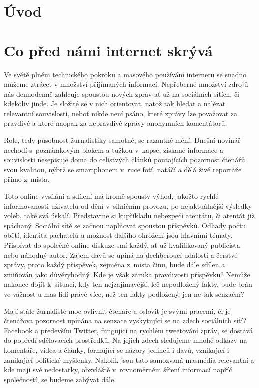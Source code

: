 \documentclass[12pt, a4paper]{article}
\numberwithin{equation}{section} 	%
\begin{document}

\newpage
\section*{Úvod}
\noindent

\newpage
\section{Co před námi internet skrývá}
\noindent Ve světě plném technického pokroku a masového používání internetu se snadno můžeme ztrácet v množství přijímaných informací. Nepřeberné množství zdrojů nás dennodenně zahlcuje spoustou nových zpráv ať už na sociálních sítích, či kdekoliv jinde. Je složité se v nich orientovat, natož tak hledat a nalézat relevantní souvislosti, neboť nikde není psáno, které zprávy lze považovat za pravdivé a které naopak za nepravdivé zprávy anonymních komentátorů.

Role, tedy působnost žurnalistiky samotné, se razantně mění. Dnešní novinář nechodí s poznámkovým blokem a tužkou v kapse, získané informace a souvislosti nesepisuje doma do celistvých článků poutajících pozornost čtenářů svou kvalitou, nýbrž se smartphonem v ruce fotí, natáčí a dělá živé reportáže přímo z místa.

Toto online vysílání a sdílení má kromě spousty výhod, jakožto rychlé informovanosti uživatelů od dění v silničním provozu, po nejaktuálnější výsledky voleb, také svá úskalí. Představme si kupříkladu nebezpečí atentátu, či atentát již spáchaný. Sociální sítě se začnou naplňovat spoustou příspěvků. Odhady počtu obětí, identita pachatelů a možnost dalšího ohrožení jsou hlavními tématy. Při\-spí\-vat do společné online diskuze smí každý, ať už kvalifikovaný publicista nebo náhodný autor. Zájem davů se upíná na dechberoucí události a čerstvé zprávy, proto každý příspěvek, zejména z místa činu, bude dále sdílen a zmiňován jako důvěryhodný. Kde je však záruka pravdivosti příspěvku? Nemůže nakonec dojít k situaci, kdy ten nejzajímavější, leč nepodložený fakty, bude brán ve vážnost u mas lidí právě více, než ten fakty podložený, jen ne tak senzační?

Mají stále žurnalisté moc ovlivnit čtenáře a oslovit je svými pracemi, či je čtenářova pozornost upínána na senzace vyskytující se na zdech sociálních sítí? Facebook a především Twitter, fungující na rychlém tweetování zpráv, se dostává do popředí sdělovacích prostředků. Na jejich zdech sledujeme mnohé odkazy na komentáře, videa a články, formující se názory jedinců i davů, vznikající i zanikající politické myšlenky. Nakolik jsou tato samozvaná masmédia relevantní a kde mají své nedostatky, obzvláště v rovnoměrném šíření informací napříč společností, se budeme zabývat dále.
\end{document}
